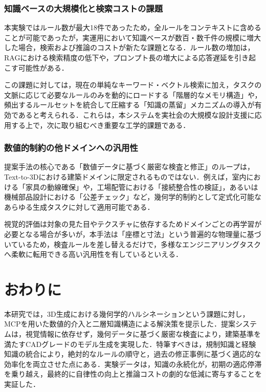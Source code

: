 \documentclass[dvipdfmx, a4paper, 9pt]{deimj}
\begin{document}
\subsubsection{知識ベースの大規模化と検索コストの課題}
本実験ではルール数が最大18件であったため，全ルールをコンテキストに含めることが可能であったが，実運用において知識ベースが数百・数千件の規模に増大した場合，検索および推論のコストが新たな課題となる．ルール数の増加は，RAGにおける検索精度の低下や，プロンプト長の増大による応答遅延を引き起こす可能性がある．

この課題に対しては，現在の単純なキーワード・ベクトル検索に加え，タスクの文脈に応じて必要なルールのみを動的にロードする「階層的なメモリ構造」や，頻出するルールセットを統合して圧縮する「知識の蒸留」メカニズムの導入が有効であると考えられる．これらは，本システムを実社会の大規模な設計支援に応用する上で，次に取り組むべき重要な工学的課題である．

\subsubsection{数値的制約の他ドメインへの汎用性}
提案手法の核心である「数値データに基づく厳密な検査と修正」のループは，Text-to-3Dにおける建築ドメインに限定されるものではない．例えば，室内における「家具の動線確保」や，工場配管における「接続整合性の検証」，あるいは機械部品設計における「公差チェック」など，幾何学的制約として定式化可能なあらゆる生成タスクに対して適用可能である．

視覚的評価は対象の見た目やテクスチャに依存するためドメインごとの再学習が必要となる場合が多いが，本手法は「座標と寸法」という普遍的な物理量に基づいているため，検査ルールを差し替えるだけで，多様なエンジニアリングタスクへ柔軟に転用できる高い汎用性を有しているといえる．

\section{おわりに}

本研究では，3D生成における幾何学的ハルシネーションという課題に対し，MCPを用いた数値的介入と二層知識構造による解決策を提示した．提案システムは，視覚情報に依存せず，幾何データに基づく厳密な検査により，建築基準を満たすCADグレードのモデル生成を実現した．特筆すべきは，規制知識と経験知識の統合により，絶対的なルールの順守と，過去の修正事例に基づく適応的な効率化を両立させた点にある．実験データは，知識の永続化が，初期の適応停滞を乗り越え，最終的に自律性の向上と推論コストの劇的な低減に寄与することを実証した．
\end{document}
